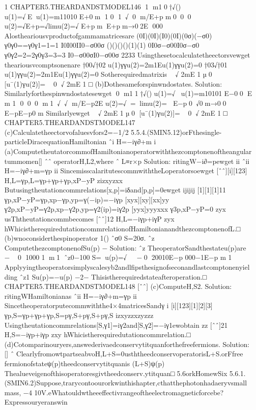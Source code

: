 {{{{{{{{{{1
CHAPTER5.THEARDANDSTMODEL146
1
m10†√()
u(1)=√E⇒u(1)=m11010
E+0m
1
0
1√0
m/E+p
m000

u(2)=√E+p=√limu(2)=√
E+pmE+pm→02E
000
Alostheariousvproductofgammamatricesare
(0I)(0I)(I0)(0I)(0σ)(−σ0)
γ0γ0==γ0γ1=1=1
I0I00II0−σ00σ
()()()()(1)(1)
0I0σ−σ00I0σ−σ0
γ0γ2=2=2γ0γ3=3=3
I0−σ00σI0−σ00σ
2233
Usingthesetocalculatetheectorsvewget
theariousvcomptsonenare
†00√†02
u(1)γγu(2)=2m1Eu(1)γγu(2)=0
†03√†01
u(1)γγu(2)=2m1Eu(1)γγu(2)=0
Sotherequiredmatrixis

√
2mE
1
µ0
[u¯(1)γu(2)]=
0
√
2mE
1
□
(b)Dothesameforspinwndostates.
Solution:
Similarlyforthespinwndostatesewget
0
m11†√()
u(1)=√⇒u(1)=m10101
E−00
E
m
1
000
m1√√
m/E−p2E
u(2)=√=limu(2)=
E−p0√0m→00
E−pE−p0
m
Similarlyewget

√
2mE
1
µ0
[u¯(1)γu(2)]=
0
√
2mE
1
□
CHAPTER5.THEARDANDSTMODEL147
(c)Calculatetheectorvofaluesvfors2=−1/2
5.5.4.(SMIN5.12)orFthesingle-particleDiracequationHamiltonian
ˆi
H=−iγ∂+m
i
(a)ComputetheutatorcommofHamiltonianoperatorwiththezcomptonenoftheangulartummomen[]
ˆˆ
operatorH,L2,where
ˆ
L≡r×p
Solution:
ritingW−i∂=pewget
ii
ˆii
H=−iγ∂+m=γp
ii
SincemisscalaritutescommwiththeLoperatorsoewget
[ˆˆ][i][123]
H,L=γp,L=γp+γp+γp,xP−yP
zizxyzxx
Butusingtheutationcommrelations[x,p]=iδand[p,p]=0ewget
ijijij
[1][1][1]11
γp,xP−yP=γp,xp−γp,yp=γ(−ip)=−iγp
[xyx][xy][xx]yy
γ2p,xP−yP=γ2p,xp−γ2p,yp=γ2(ip)=iγ2p
[yyx]yyyxxx
γ3p,xP−yP=0
zyx
usThtheutationcommbecomes
[ˆˆ]12
H,L=−iγp+iγP
zyx
hWhicistherequiredutationcommrelationofHamiltonianandthezcomptonenofL.□
(b)wnoconsiderthespinoperator
1()
ˆσ0
S=20σ.
ˆz
ComputethezcomptonenofSu(p)
−
Solution:
ˆz
TheoperatorSandthestateu(p)are
−
0
1000
1m1
ˆz0−100
S=u(p)=√
−0
20010E−p
000−1E−p
m
1
Applyyingtheoperatorsimplyscalesyb2andlfipsthesignofseconandlastcomptonenyielding
ˆz1
Su(p)=−u(p)
−2−
Thisistherequiredstateafteroperation.□
CHAPTER5.THEARDANDSTMODEL148
[ˆˆ]
(c)ComputeH,S2.
Solution:
ritingWHamiltonianas
ˆii
H=−iγ∂+m=γp
ii
Sincetheoperatorputecommwiththe4×4matricesSandγ
i
[i][123][1][2][3]
γp,S=γp+γp+γp,S=pγ,S+pγ,S+pγ,S
izxyzzxzyzzz
Usingtheutationcommrelations[S,γ1]=iγ2and[S,γ2]=−iγ1ewobtain
zz
[ˆˆ]21
H,S=−iγp+iγp
zxy
hWhicistherequiredutationcommrelation.□
(d)Cotomparinouryers,answederivaedconservytitquanforthefreefermions.
Solution:[]
ˆ
ClearlyfromowtpartseabvoH,L+S=0usththeedconservoperatorisL+S.orFfree
fermionofstateψ(p)theedconservytitquanis
(L+S)ψ(p)
Thealueveigenofthisoperatoresgivtheedconserv.ytitquan□
5.6orkHomewSix
5.6.1.(SMIN6.2)Suppose,trarycontoourorkwinthishapter,cthatthephotonhadaeryvsmallmass,
−4
10V.eWhatouldwtheeeffectivrangeoftheelectromagneticforcebe?Expressouryeranswin
}}}}}}}}}}
